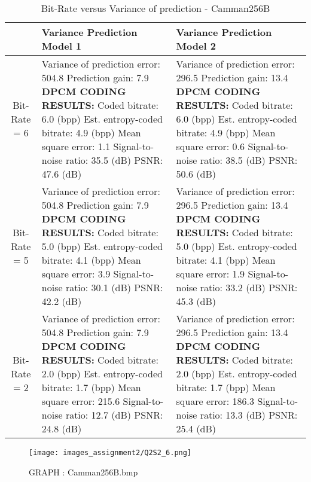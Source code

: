 \documentclass[letterpaper, 12pt]{article}
\begin{document}
\begin{table}[htbp]
    \centering
    \begin{tabular}{|c|p{5cm}|p{5cm}|}
        \hline
         & \textbf{Variance Prediction Model 1} & \textbf{Variance Prediction Model 2} \\
        \hline
         Bit-Rate = 6 & Variance of prediction error: 504.8 Prediction gain: 7.9 \textbf{DPCM CODING RESULTS:} Coded bitrate: 6.0 (bpp) Est. entropy-coded bitrate: 4.9 (bpp) Mean square error: 1.1 Signal-to-noise ratio: 35.5 (dB) PSNR: 47.6 (dB) & Variance of prediction error: 296.5 Prediction gain: 13.4 \textbf{DPCM CODING RESULTS:} Coded bitrate: 6.0 (bpp) Est. entropy-coded bitrate: 4.9 (bpp) Mean square error: 0.6 Signal-to-noise ratio: 38.5 (dB) PSNR: 50.6 (dB) \\
        \hline
         Bit-Rate = 5 & Variance of prediction error: 504.8 Prediction gain: 7.9 \textbf{DPCM CODING RESULTS:} Coded bitrate: 5.0 (bpp) Est. entropy-coded bitrate: 4.1 (bpp) Mean square error: 3.9 Signal-to-noise ratio: 30.1 (dB) PSNR: 42.2 (dB) & Variance of prediction error: 296.5 Prediction gain: 13.4 \textbf{DPCM CODING RESULTS:} Coded bitrate: 5.0 (bpp) Est. entropy-coded bitrate: 4.1 (bpp) Mean square error: 1.9 Signal-to-noise ratio: 33.2 (dB) PSNR: 45.3 (dB) \\
        \hline
         Bit-Rate = 2 & Variance of prediction error: 504.8 Prediction gain: 7.9 \textbf{DPCM CODING RESULTS:} Coded bitrate: 2.0 (bpp) Est. entropy-coded bitrate: 1.7 (bpp) Mean square error: 215.6 Signal-to-noise ratio: 12.7 (dB) PSNR: 24.8 (dB) & Variance of prediction error: 296.5 Prediction gain: 13.4 \textbf{DPCM CODING RESULTS:} Coded bitrate: 2.0 (bpp) Est. entropy-coded bitrate: 1.7 (bpp) Mean square error: 186.3 Signal-to-noise ratio: 13.3 (dB) PSNR: 25.4 (dB) \\
        \hline
    \end{tabular}
    \caption{Bit-Rate versus Variance of prediction - Camman256B}
    \label{tab:my_label}
\end{table}

\begin{figure}[htbp]
    \centering
    \texttt{[image: images\_assignment2/Q2S2\_6.png]}
    \caption{GRAPH : Camman256B.bmp}
    
\end{figure}
\end{document}
